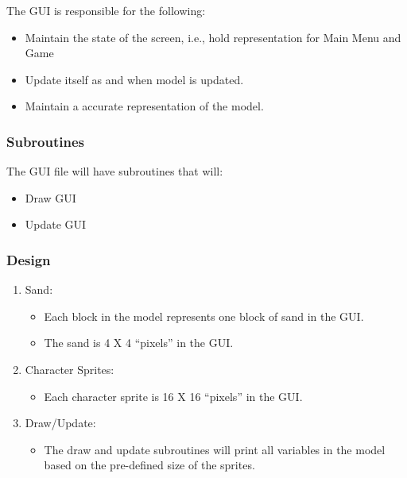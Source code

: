 \documentclass[]{article}
\begin{document}
The GUI is responsible for the following:

\begin{itemize}
\itemsep1pt\parskip0pt
\item
  Maintain the state of the screen, i.e., hold representation for Main
  Menu and Game
\item
  Update itself as and when model is updated.
\item
  Maintain a accurate representation of the model.
\end{itemize}

\subsubsection{Subroutines}\label{subroutines-1}

The GUI file will have subroutines that will:

\begin{itemize}
\itemsep1pt\parskip0pt
\item
  Draw GUI
\item
  Update GUI
\end{itemize}

\subsubsection{Design}\label{design-1}

\begin{enumerate}
\def\labelenumi{\arabic{enumi}.}
\itemsep1pt\parskip0pt
\item
  Sand:

  \begin{itemize}
  \itemsep1pt\parskip0pt
  \item
    Each block in the model represents one block of sand in the GUI.
  \item
    The sand is 4 X 4 ``pixels'' in the GUI.
  \end{itemize}
\item
  Character Sprites:

  \begin{itemize}
  \itemsep1pt\parskip0pt
  \item
    Each character sprite is 16 X 16 ``pixels'' in the GUI.
  \end{itemize}
\item
  Draw/Update:

  \begin{itemize}
  \itemsep1pt\parskip0pt
  \item
    The draw and update subroutines will print all variables in the
    model based on the pre-defined size of the sprites.
  \end{itemize}
\end{enumerate}
\end{document}
